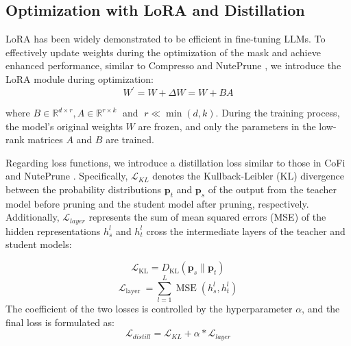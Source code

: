 \subsection{Optimization with LoRA and Distillation}
LoRA \cite{hu2021lora} has been widely demonstrated to be efficient in fine-tuning LLMs. To effectively update weights during the optimization of the mask and achieve enhanced performance, similar to Compresso \cite{guo2023compresso} and NutePrune \cite{li2024nuteprune}, we introduce the LoRA module during optimization:
$$
W^{\prime}={W}+\Delta W=W+BA
$$

where $B \in  {\mathbb{R}}^{d \times  r},A \in  {\mathbb{R}}^{r \times  k}\;$ and $\;r \ll  \min \left( {d,k}\right)$. During the training process, the model's original weights $W$ are frozen, and only the parameters in the low-rank matrices $A$ and $B$ are trained.

Regarding loss functions, we introduce a distillation loss similar to those in CoFi \cite{xia2022structured} and NutePrune \cite{li2024nuteprune}. Specifically, $\mathcal{L}_{KL}$
denotes the Kullback-Leibler (KL) divergence between the probability distributions ${\mathbf{p}}_{t}$ and ${\mathbf{p}}_{s}$ of the output from the teacher model before pruning and the student model after pruning, respectively. Additionally, $\mathcal{L}_{layer}$ represents the sum of mean squared errors (MSE) of the hidden representations $h_s^l$ and $h_t^l$ cross the intermediate layers of the teacher and student models:

$$
{\mathcal{L}}_{\text{KL}} = {D}_{\mathrm{{KL}}}\left( {{\mathbf{p}}_{s}\parallel {\mathbf{p}}_{t}}\right)
$$
$$
{\mathcal{L}}_{\text{layer }} = \mathop{\sum }\limits_{l=1}^{L}\operatorname{MSE}(h_s^l,h_t^l)
$$
The coefficient of the two losses is controlled by the hyperparameter $\alpha$, and the final loss is formulated as:
$$
\mathcal{L}_{distill}=\mathcal{L}_{KL}+\alpha * \mathcal{L}_{layer}
$$






